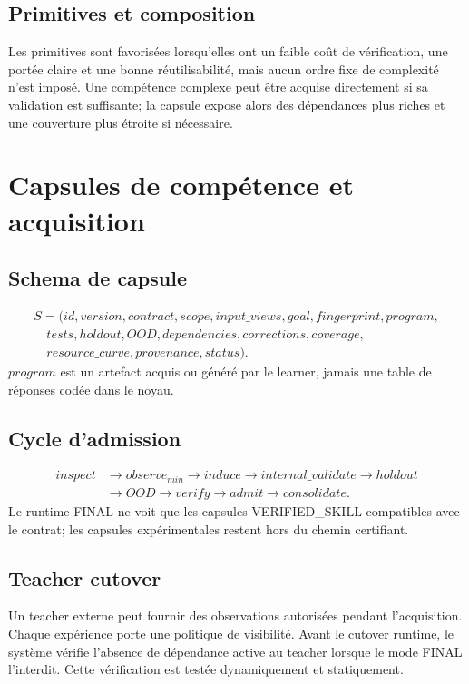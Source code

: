 \documentclass[11pt,a4paper]{report}
\begin{document}
\section{Primitives et composition}
Les primitives sont favorisées lorsqu'elles ont un faible coût de vérification, une portée claire et une bonne réutilisabilité, mais aucun ordre fixe de complexité n'est imposé. Une compétence complexe peut être acquise directement si sa validation est suffisante; la capsule expose alors des dépendances plus riches et une couverture plus étroite si nécessaire.

\chapter{Capsules de compétence et acquisition}
\section{Schema de capsule}
\[
\begin{aligned}
S=(id,version,contract,scope,input\_views,goal,fingerprint,program,\\
\quad tests,holdout,OOD,dependencies,corrections,coverage,\\
\quad resource\_curve,provenance,status).
\end{aligned}
\]
$program$ est un artefact acquis ou généré par le learner, jamais une table de réponses codée dans le noyau.

\section{Cycle d'admission}
\[
\begin{aligned}
inspect &\to observe_{min} \to induce \to internal\_validate \to holdout \\
&\to OOD \to verify \to admit \to consolidate.
\end{aligned}
\]
Le runtime FINAL ne voit que les capsules VERIFIED\_SKILL compatibles avec le contrat; les capsules expérimentales restent hors du chemin certifiant.

\section{Teacher cutover}
Un teacher externe peut fournir des observations autorisées pendant l'acquisition. Chaque expérience porte une politique de visibilité. Avant le cutover runtime, le système vérifie l'absence de dépendance active au teacher lorsque le mode FINAL l'interdit. Cette vérification est testée dynamiquement et statiquement.
\end{document}
